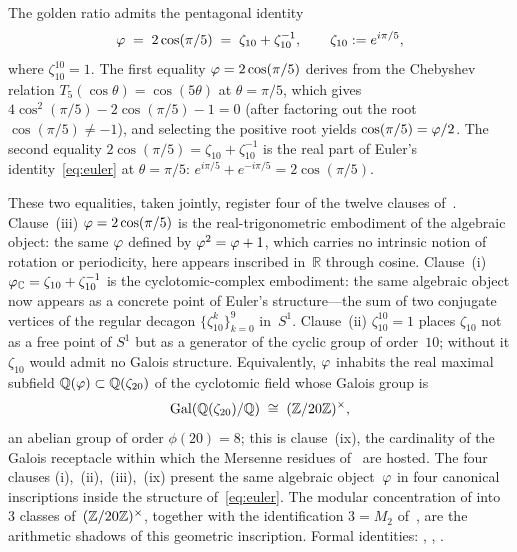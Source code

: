 \begin{Remark}\label{rem:pentagon}
The golden ratio admits the pentagonal identity
\begin{equation}\label{eq:pentagon}
  \varphi \;=\; 2\cos(\pi/5) \;=\; \zeta_{10}+\zeta_{10}^{-1},
  \qquad \zeta_{10} := e^{i\pi/5},
\end{equation}
where $\zeta_{10}^{10}=1$.  The first equality
$\varphi=2\cos(\pi/5)$ derives from the Chebyshev relation
$T_{5}(\cos\theta)=\cos(5\theta)$ at $\theta=\pi/5$, which gives
$4\cos^{2}(\pi/5)-2\cos(\pi/5)-1=0$ (after factoring out the root
$\cos(\pi/5)\neq -1$), and selecting the positive root yields
$\cos(\pi/5)=\varphi/2$.  The second equality
$2\cos(\pi/5)=\zeta_{10}+\zeta_{10}^{-1}$ is the real part of Euler's
identity~\eqref{eq:euler} at $\theta=\pi/5$:
$e^{i\pi/5}+e^{-i\pi/5}=2\cos(\pi/5)$.

These two equalities, taken jointly, register four of the twelve
clauses of~.  Clause~(iii)
$\varphi=2\cos(\pi/5)$ is the real-trigonometric embodiment of the
algebraic object: the same $\varphi$ defined by $\varphi^{2}=\varphi+1$,
which carries no intrinsic notion of rotation or periodicity, here
appears inscribed in~$\mathbb{R}$ through cosine.  Clause~(i)
$\varphi_\mathbb{C}=\zeta_{10}+\zeta_{10}^{-1}$ is the
cyclotomic-complex embodiment: the same algebraic object now appears as
a concrete point of Euler's structure---the sum of two conjugate
vertices of the regular decagon $\{\zeta_{10}^{k}\}_{k=0}^{9}$
in~$S^{1}$.  Clause~(ii) $\zeta_{10}^{10}=1$ places $\zeta_{10}$ not
as a free point of $S^{1}$ but as a generator of the cyclic group of
order~$10$; without it $\zeta_{10}$ would admit no Galois structure.
Equivalently, $\varphi$ inhabits the real maximal subfield
$\mathbb{Q}(\varphi)\subset\mathbb{Q}(\zeta_{20})$ of the cyclotomic
field whose Galois group is
\[
  \mathrm{Gal}(\mathbb{Q}(\zeta_{20})/\mathbb{Q}) \;\cong\;
  (\mathbb{Z}/20\mathbb{Z})^{\times},
\]
an abelian group of order $\phi(20)=8$; this is clause~(ix), the
cardinality of the Galois receptacle within which the Mersenne
residues of~ are hosted.  The four
clauses (i),~(ii),~(iii),~(ix) present the same algebraic
object~$\varphi$ in four canonical inscriptions inside the structure
of~\eqref{eq:euler}.  The modular concentration of
 into~$3$ classes of~$(\mathbb{Z}/20\mathbb{Z})^{\times}$, together
with the identification $3=M_{2}$ of~, are the
arithmetic shadows of this geometric inscription.  Formal identities:
, ,
.
\end{Remark}

